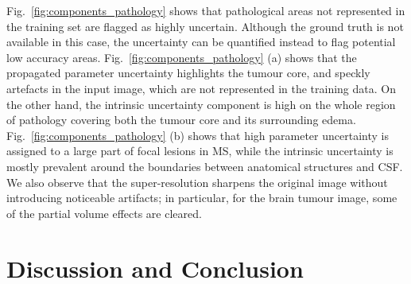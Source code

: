 Fig.~\ref{fig:components_pathology} shows that pathological areas not represented in the training set are flagged as highly uncertain. Although the ground truth is not available in this case, the uncertainty can be quantified instead to flag potential low accuracy areas. Fig.~\ref{fig:components_pathology} (a) shows that the propagated parameter uncertainty highlights the tumour core, and speckly artefacts in the input image, which are not represented in the training data. On the other hand, the intrinsic uncertainty component is high on the whole region of pathology covering both the tumour core and its surrounding edema. Fig.~\ref{fig:components_pathology} (b) shows that high parameter uncertainty is assigned to a large part of focal lesions in MS, while the intrinsic uncertainty is mostly prevalent around the boundaries between anatomical structures and CSF. We also observe that the super-resolution sharpens the original image without introducing noticeable artifacts; in particular, for the brain tumour image, some of the partial volume effects are cleared. 



\section{Discussion and Conclusion}

